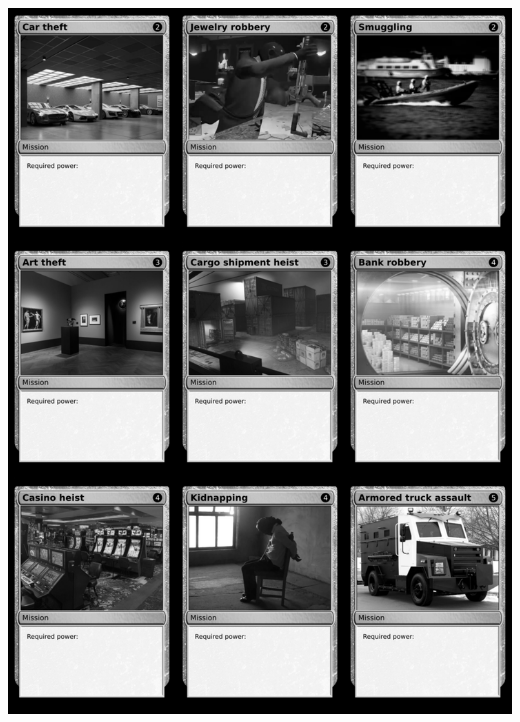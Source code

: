 \documentclass[a4paper]{article}
\begin{document}
\begin{center}
	\centering
	\includegraphics[width=190.5mm,height=266.7mm]{output/temp/page33.png}
\end{center}

\newpage
\end{document}

